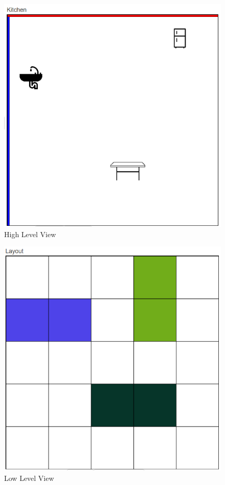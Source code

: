 \begin{figure}
	\includegraphics[width=1\textwidth]{figures/Highlevel_View}
	\caption{High Level View}
	\label{fig:HighLevel_View}
\end{figure}
\begin{figure}
	\includegraphics[width=1\textwidth]{figures/Lowlevel_View}
	\caption{Low Level View}
	\label{fig:LowLevel_View}
\end{figure}
